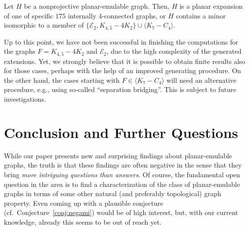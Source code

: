 \documentclass[envcountsect,envcountsame]{llncs}
\newcommand{\EE}{\ensuremath{\mathcal{E}_2}\xspace}
\begin{document}
\begin{theorem}
\label{thm:our_result}
Let $H$ be a nonprojective planar-emulable graph. 
Then, $H$ is a planar expansion of one of specific $175$ 
internally 4-connected graphs, or $H$ contains a minor isomorphic
to a member of $\{\EE,K_{4,5}-4K_2\}\cup \langle K_7-C_4 \rangle$.
\end{theorem}

Up to this point, we have not been successful in finishing the computations 
for the graphs $F= K_{4,5} - 4K_2$ and $\mathcal{E}_2$,
due to the high complexity of the generated extensions.
Yet, we strongly believe that it is possible to obtain finite results
also for those cases, perhaps with the help of an improved generating procedure.
On the other hand, the cases starting with $F\in\langle K_7-C_4\rangle$
will need an alternative procedure, e.g., using so-called ``separation bridging''.
This is subject to future investigations.










\section{Conclusion and Further Questions}
\label{sec:conclus}

While our paper presents new and surprising findings about
planar-emulable graphs, the truth is that these findings are often negative
in the sense that they bring {\em more intriguing questions than answers}.
Of course, the fundamental open question in the area is to find a
characterization of the class of planar-emulable graphs in terms of some
other natural (and preferably topological) graph property.
Even coming up with a plausible conjecture (cf.~Conjecture~\ref{conj:negami})
would be of high interest, but, with
our current knowledge, already this seems to be out of reach yet.
\end{document}
